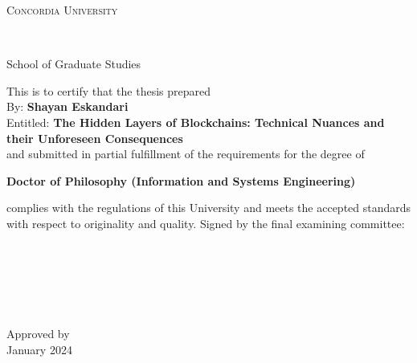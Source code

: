 
\thispagestyle{empty} %

\begin{center}\begin{Large} \textsc{Concordia University} \end{Large} \\
\begin{large} School of Graduate Studies \end{large} \end{center}
\vfill
This is to certify that the thesis prepared\\
By: \tab   \textbf{Shayan Eskandari} \\
Entitled: \tab \textbf{The Hidden Layers of Blockchains: Technical Nuances and their Unforeseen Consequences}\\
 and submitted in partial fulfillment of the requirements for the degree of
\begin{center}
\textbf{Doctor of Philosophy (Information and Systems Engineering)}
\end{center}
complies with the regulations of this University and meets the
accepted standards with respect to originality and quality.
\vfill
\noindent Signed by the final examining committee: \\[1.3em] %
\hspace*{1cm} \hrulefill {} \\[1.3em]
\hspace*{1cm} \hrulefill {} \\[1.3em]
\hspace*{1cm} \hrulefill {} \\[1.3em]
\hspace*{1cm} \hrulefill {} \\[1.3em]
\hspace*{1cm} \hrulefill {} \\[1.3em]
\hspace*{1cm} \hrulefill {} \\[1.3em]
\vfill
\noindent Approved by \hrulefill \\[1.3em]
 January 2024 \hrulefill \\




